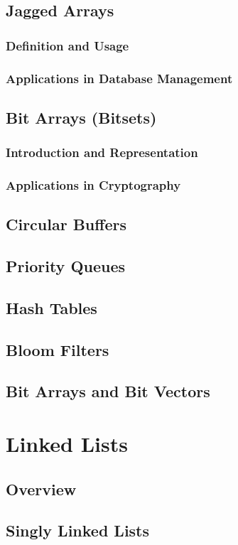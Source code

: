 \documentclass[12pt, oneside]{book}
\begin{document}
	\section{Jagged Arrays}
	\subsection{Definition and Usage}
	\subsection{Applications in Database Management}
	
	\section{Bit Arrays (Bitsets)}
	\subsection{Introduction and Representation}
	\subsection{Applications in Cryptography}
	\section{Circular Buffers}
	\section{Priority Queues}
	\section{Hash Tables}
	\section{Bloom Filters}
	\section{Bit Arrays and Bit Vectors}
	
\chapter{Linked Lists}
\section{Overview}
\section{Singly Linked Lists}
\end{document}
